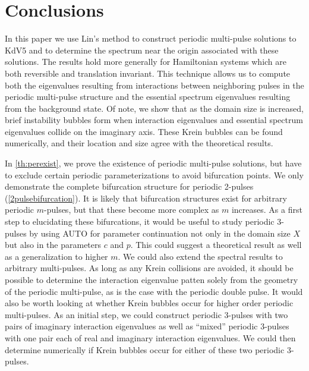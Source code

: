 \documentclass[12pt]{elsarticle}
\theoremstyle{plain}
\theoremstyle{definition}
\theoremstyle{remark}
\numberwithin{theorem}{section}
\numberwithin{equation}{section}
\begin{document}
\section{Conclusions}\label{sec:conclusions}

In this paper we use Lin's method to construct periodic multi-pulse solutions to KdV5 and to determine the spectrum near the origin associated with these solutions. The results hold more generally for Hamiltonian systems which are both reversible and translation invariant. This technique allows us to compute both the eigenvalues resulting from interactions between neighboring pulses in the periodic multi-pulse structure and the essential spectrum eigenvalues resulting from the background state. Of note, we show that as the domain size is increased, brief instability bubbles form when interaction eigenvalues and essential spectrum eigenvalues collide on the imaginary axis. These Krein bubbles can be found numerically, and their location and size agree with the theoretical results.

In \cref{th:perexist}, we prove the existence of periodic multi-pulse solutions, but have to exclude certain periodic parameterizations to avoid bifurcation points. We only demonstrate the complete bifurcation structure for periodic 2-pulses (\cref{2pulsebifurcation}). It is likely that bifurcation structures exist for arbitrary periodic $m$-pulses, but that these become more complex as $m$ increases. As a first step to elucidating these bifurcations, it would be useful to study periodic 3-pulses by using AUTO for parameter continuation not only in the domain size $X$ but also in the parameters $c$ and $p$. This could suggest a theoretical result as well as a generalization to higher $m$. We could also extend the spectral results to arbitrary multi-pulses. As long as any Krein collisions are avoided, it should be possible to determine the interaction eigenvalue patten solely from the geometry of the periodic multi-pulse, as is the case with the periodic double pulse. It would also be worth looking at whether Krein bubbles occur for higher order periodic multi-pulses. As an initial step, we could construct periodic 3-pulses with two pairs of imaginary interaction eigenvalues as well as ``mixed'' periodic 3-pulses with one pair each of real and imaginary interaction eigenvalues. We could then determine numerically if Krein bubbles occur for either of these two periodic 3-pulses.
\end{document}
